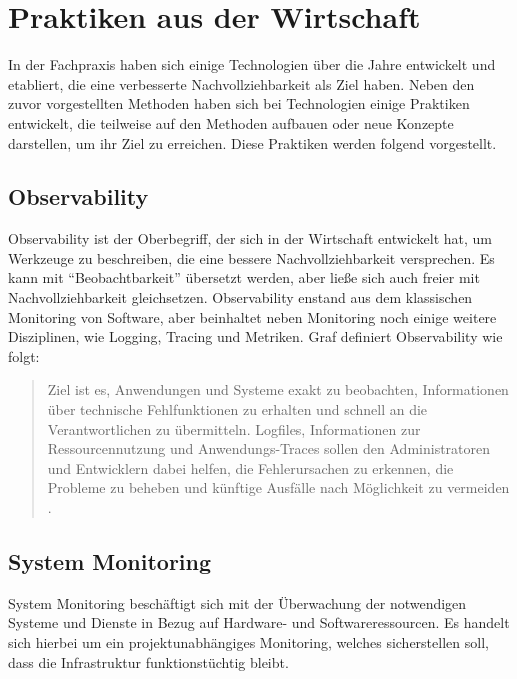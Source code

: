 \section{Praktiken aus der Wirtschaft}

In der Fachpraxis haben sich einige Technologien über die Jahre entwickelt und etabliert, die eine verbesserte Nachvollziehbarkeit als Ziel haben. Neben den zuvor vorgestellten Methoden haben sich bei Technologien einige Praktiken entwickelt, die teilweise auf den Methoden aufbauen oder neue Konzepte darstellen, um ihr Ziel zu erreichen. Diese Praktiken werden folgend vorgestellt.

\subsection{Observability}

Observability ist der Oberbegriff, der sich in der Wirtschaft entwickelt hat, um Werkzeuge zu beschreiben, die eine bessere Nachvollziehbarkeit versprechen. Es kann mit \enquote{Beobachtbarkeit} übersetzt werden, aber ließe sich auch freier mit Nachvollziehbarkeit gleichsetzen. Observability enstand aus dem klassischen Monitoring von Software, aber beinhaltet neben Monitoring noch einige weitere Disziplinen, wie Logging, Tracing und Metriken. Graf \cite{MichaelGrafBA} definiert Observability wie folgt:


\begin{quotation}
Ziel ist es, Anwendungen und Systeme exakt zu beobachten, Informationen über technische Fehlfunktionen zu erhalten und schnell an die Verantwortlichen zu übermitteln. Logfiles, Informationen zur Ressourcennutzung und Anwendungs-Traces sollen den Administratoren und Entwicklern dabei helfen, die Fehlerursachen zu erkennen, die Probleme zu beheben und künftige Ausfälle nach Möglichkeit zu vermeiden \cite{DistributedSystemsObservability}.
\end{quotation}

\subsection{System Monitoring}

System Monitoring beschäftigt sich mit der Überwachung der notwendigen Systeme und Dienste in Bezug auf Hardware- und Softwareressourcen. Es handelt sich hierbei um ein projektunabhängiges Monitoring, welches sicherstellen soll, dass die Infrastruktur funktionstüchtig bleibt.

